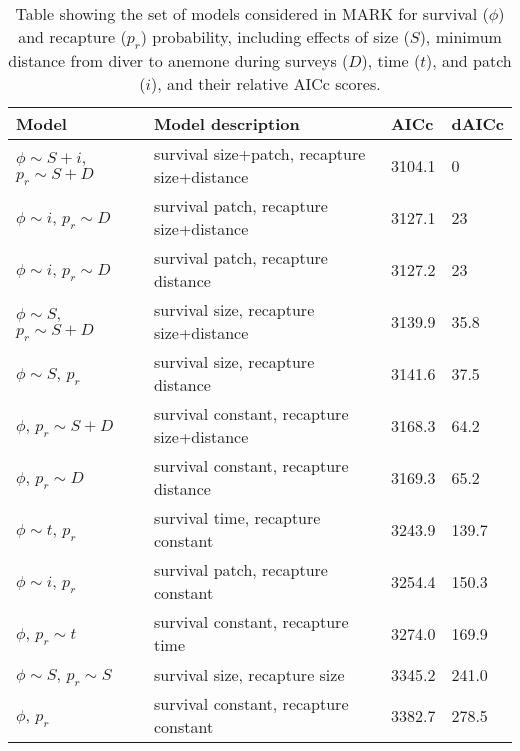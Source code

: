 \documentclass[12pt, oneside]{article}   	%
\begin{document}
\begin{table}[!htbp]
\begin{centering}
\caption{Table showing the set of models considered in MARK for survival ($\phi$) and recapture ($p_r$) probability, including effects of size ($S$), minimum distance from diver to anemone during surveys ($D$), time ($t$), and patch ($i$), and their relative AICc scores.}\label{APP_TAB_MARKmodels}
\begin{tabular}{|p{2in}|p{2.5in}|p{0.75in}|p{0.75in}|}
\hline 
\textbf{Model} & \textbf{Model description} & \textbf{AICc} & \textbf{dAICc} \\ \hline
$\phi \sim S+i$, $p_r \sim S+D$ & survival size+patch, recapture size+distance & 3104.1 & 0 \\ \hline
$\phi \sim i$, $p_r \sim D$ & survival patch, recapture size+distance & 3127.1 & 23 \\ \hline
$\phi \sim i$, $p_r \sim D$ & survival patch, recapture distance & 3127.2 & 23 \\ \hline
$\phi \sim S$, $p_r \sim S+D$ & survival size, recapture size+distance & 3139.9 & 35.8 \\ \hline
$\phi \sim S$, $p_r$ & survival size, recapture distance & 3141.6 & 37.5 \\ \hline
$\phi$, $p_r \sim S+D$ & survival constant, recapture size+distance & 3168.3 & 64.2 \\ \hline
$\phi$, $p_r \sim D$ & survival constant, recapture distance & 3169.3 & 65.2 \\ \hline
$\phi \sim t$, $p_r$ & survival time, recapture constant & 3243.9 & 139.7 \\ \hline
$\phi \sim i$, $p_r$ & survival patch, recapture constant & 3254.4 & 150.3 \\ \hline
$\phi$, $p_r \sim t$ & survival constant, recapture time & 3274.0 & 169.9 \\ \hline
$\phi \sim S$, $p_r \sim S$ & survival size, recapture size & 3345.2 & 241.0 \\ \hline
$\phi$, $p_r$ & survival constant, recapture constant & 3382.7 & 278.5 \\ \hline
\end{tabular}
\end{centering}
\end{table}
\end{document}
